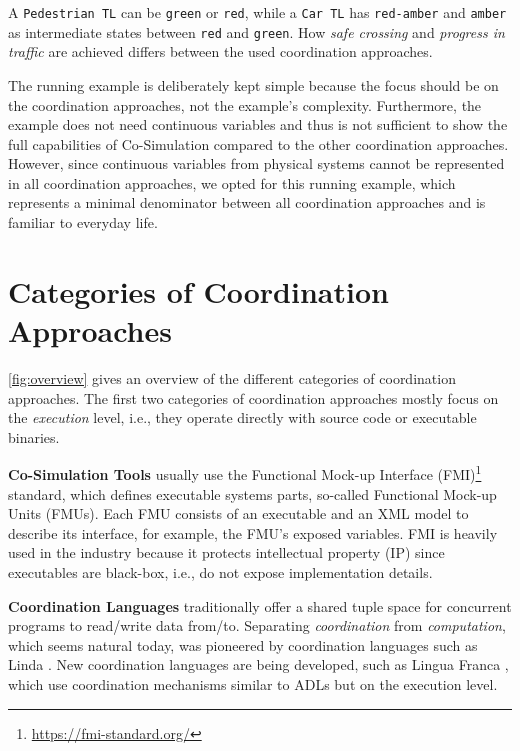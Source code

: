 \documentclass[runningheads]{llncs}
\begin{document}
A \texttt{Pedestrian TL} can be \texttt{green} or \texttt{red}, while a \texttt{Car TL} has \texttt{red-amber} and \texttt{amber} as intermediate states between \texttt{red} and \texttt{green}.
How \textit{safe crossing} and \textit{progress in traffic} are achieved differs between the used coordination approaches.

The running example is deliberately kept simple because the focus should be on the coordination approaches, not the example's complexity.
Furthermore, the example does not need continuous variables and thus is not sufficient to show the full capabilities of Co-Simulation compared to the other coordination approaches.
However, since continuous variables from physical systems cannot be represented in all coordination approaches, we opted for this running example, which represents a minimal denominator between all coordination approaches and is familiar to everyday life.

\section{Categories of Coordination Approaches} \label{sec:approaches}

\autoref{fig:overview} gives an overview of the different categories of coordination approaches.
The first two categories of coordination approaches mostly focus on the \textit{execution} level, i.e., they operate directly with source code or executable binaries.

\textbf{Co-Simulation Tools} usually use the Functional Mock-up Interface (FMI)\footnote{\url{https://fmi-standard.org/}} standard, which defines executable systems parts, so-called Functional Mock-up Units (FMUs).
Each FMU consists of an executable and an XML model to describe its interface, for example, the FMU's exposed variables.
FMI is heavily used in the industry because it protects intellectual property (IP) since executables are black-box, i.e., do not expose implementation details.

\textbf{Coordination Languages} traditionally offer a shared tuple space for concurrent programs to read/write data from/to.
Separating \textit{coordination} from \textit{computation}, which seems natural today, was pioneered by coordination languages such as Linda \cite{carrieroLindaContext1989}.
New coordination languages are being developed, such as Lingua Franca \cite{lohstrohReactorsDeterministicModel2020}, which use coordination mechanisms similar to ADLs but on the execution level.
\end{document}
